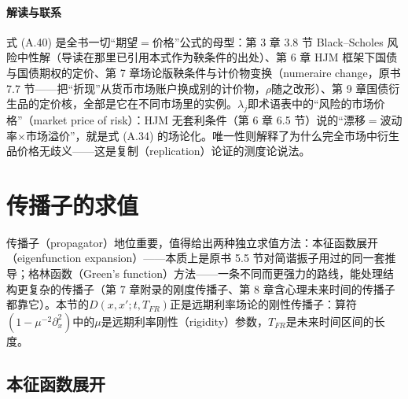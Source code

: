 \paragraph{解读与联系}
式 (A.40) 是全书一切“期望$=$价格”公式的母型：第 3 章 3.8 节 Black--Scholes 风险中性解（导读在那里已引用本式作为鞅条件的出处）、第 6 章 HJM 框架下国债与国债期权的定价、第 7 章场论版鞅条件与计价物变换（numeraire change，原书 7.7 节——把“折现”从货币市场账户换成别的计价物，$\rho$随之改形）、第 9 章国债衍生品的定价核，全部是它在不同市场里的实例。$\lambda_j$即术语表中的“风险的市场价格”（market price of risk）：HJM 无套利条件（第 6 章 6.5 节）说的“漂移$=$波动率$\times$市场溢价”，就是式 (A.34) 的场论化。唯一性则解释了为什么完全市场中衍生品价格无歧义——这是复制（replication）论证的测度论说法。

\section{传播子的求值}

传播子（propagator）地位重要，值得给出两种独立求值方法：本征函数展开（eigenfunction expansion）——本质上是原书 5.5 节对简谐振子用过的同一套推导；格林函数（Green's function）方法——一条不同而更强力的路线，能处理结构更复杂的传播子（第 7 章附录的刚度传播子、第 8 章含心理未来时间的传播子都靠它）。本节的$D(x,x';t,T_{FR})$正是远期利率场论的刚性传播子：算符$(1-\mu^{-2}\partial_x^2)$中的$\mu$是远期利率刚性（rigidity）参数，$T_{FR}$是未来时间区间的长度。

\subsection{本征函数展开}

